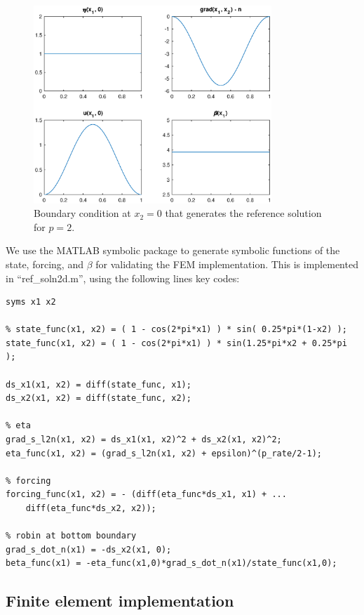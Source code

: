 \documentclass[a4paper,11pt]{scrartcl}
\begin{document}
\begin{figure}
\centerline{\includegraphics[width=0.8\textwidth]{ref_boundary_p2.eps}}
\caption{Boundary condition at $x_2 = 0$ that generates the reference solution for $p=2$. }
\label{fig:pp_bnd}
\end{figure}

We use the MATLAB symbolic package to generate symbolic functions of the state, forcing, and $\beta$ for validating the FEM implementation.
%
This is implemented in ``ref\_soln2d.m'', using the following lines key codes:

\begin{verbatim}
syms x1 x2

% state_func(x1, x2) = ( 1 - cos(2*pi*x1) ) * sin( 0.25*pi*(1-x2) );
state_func(x1, x2) = ( 1 - cos(2*pi*x1) ) * sin(1.25*pi*x2 + 0.25*pi );

ds_x1(x1, x2) = diff(state_func, x1);
ds_x2(x1, x2) = diff(state_func, x2);

% eta
grad_s_l2n(x1, x2) = ds_x1(x1, x2)^2 + ds_x2(x1, x2)^2;
eta_func(x1, x2) = (grad_s_l2n(x1, x2) + epsilon)^(p_rate/2-1);

% forcing
forcing_func(x1, x2) = - (diff(eta_func*ds_x1, x1) + ...
    diff(eta_func*ds_x2, x2));

% robin at bottom boundary
grad_s_dot_n(x1) = -ds_x2(x1, 0);
beta_func(x1) = -eta_func(x1,0)*grad_s_dot_n(x1)/state_func(x1,0);
\end{verbatim}


\subsection{Finite element implementation}
\end{document}

